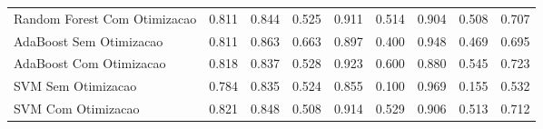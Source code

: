 \begin{table}[H]
\begin{adjustwidth}{ -1in }{ -1in }
\begin{tabular}{lrrrrrrrr}
      Random Forest Com Otimizacao &                        0.811 &                         0.844 &                            0.525 &                            0.911 &                          0.514 &                          0.904 &                                     0.508 &                                 0.707 \\
           AdaBoost Sem Otimizacao &                        0.811 &                         0.863 &                            0.663 &                            0.897 &                          0.400 &                          0.948 &                                     0.469 &                                 0.695 \\
           AdaBoost Com Otimizacao &                        0.818 &                         0.837 &                            0.528 &                            0.923 &                          0.600 &                          0.880 &                                     0.545 &                                 0.723 \\
                SVM Sem Otimizacao &                        0.784 &                         0.835 &                            0.524 &                            0.855 &                          0.100 &                          0.969 &                                     0.155 &                                 0.532 \\
                SVM Com Otimizacao &                        0.821 &                         0.848 &                            0.508 &                            0.914 &                          0.529 &                          0.906 &                                     0.513 &                                 0.712 \\
\bottomrule
\end{tabular}
    \end{adjustwidth}
    \renewcommand{\arraystretch}{1.0} %
\end{table}
